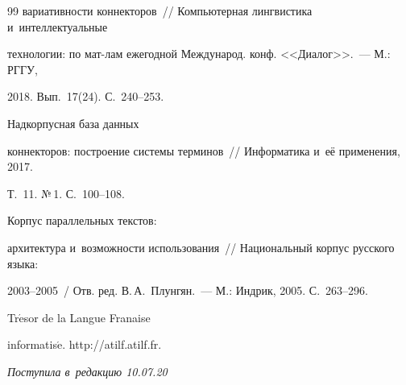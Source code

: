 {{\begin{thebibliography}{99}
вариативности коннекторов~/\!\!/ Компьютерная лингвистика и~интеллектуальные 


технологии: по мат-лам ежегодной Международ. конф. <<Диалог>>.~---  М.: РГГУ, 


2018. Вып.~17(24). С.~240--253.




 Надкорпусная база данных 


коннекторов: построение системы терминов~/\!\!/ Информатика и~её применения, 2017. 


Т.~11. №\,1. С.~100--108. 




 Корпус параллельных текстов: 


архитектура и~возможности использования~/\!\!/ Национальный корпус русского языка: 


2003--2005~/ Отв. ред. В.\,А.~Плунгян.~--- М.: Индрик, 2005. С.~263--296.




Tr$\acute{\mbox{e}}$sor de la Langue \mbox{Fran{}aise} 


informatis$\acute{\mbox{e}}$. {\sf http://atilf.atilf.fr}.


    \end{thebibliography}


} }








\vspace*{-3pt}





\hfill{\small\textit{Поступила в~редакцию 10.07.20}}





























